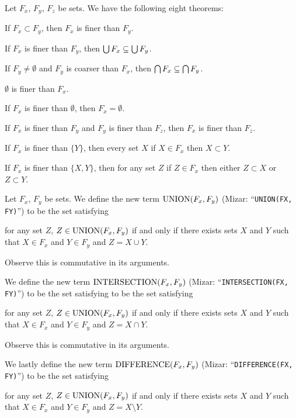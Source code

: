\documentclass{article}
\begin{document}
Let $F_{x}$, $F_{y}$, $F_{z}$ be sets. We have the following eight theorems:
\begin{thm}
\item\label{setfam1:12} If $F_{x}\subset F_{y}$, then $F_{x}$ is finer
  than $F_{y}$.
\item\label{setfam1:13} If $F_{x}$ is finer than $F_{y}$, then $\bigcup F_{x}\subseteq \bigcup F_{y}$.
\item\label{setfam1:14} If $F_{y}\neq\emptyset$ and $F_{y}$ is coarser
  than $F_{x}$, then $\bigcap F_{x}\subseteq\bigcap F_{y}$.
\item\label{setfam1:15} $\emptyset$ is finer than $F_{x}$.
\item\label{setfam1:16} If $F_{x}$ is finer than $\emptyset$, then $F_{x}=\emptyset$.
\item\label{setfam1:17} If $F_{x}$ is finer than $F_{y}$ and $F_{y}$ is
  finer than $F_{z}$, then $F_{x}$ is finer than $F_{z}$.
\item\label{setfam1:18} If $F_{x}$ is finer than $\{Y\}$, then every set $X$
  if $X\in F_{x}$ then $X\subset Y$. 
\item\label{setfam1:19} If $F_{x}$ is finer than $\{X,Y\}$, then for any
  set $Z$ if $Z\in F_{x}$ then either $Z\subset X$ or $Z\subset Y$.
\end{thm}

\begin{definition}
  Let $F_{x}$, $F_{y}$ be sets.
We define the new term $\operatorname{UNION}(F_{x},F_{y})$ (Mizar:
  ``\verb#UNION(FX, FY)#'')
to be the set satisfying
\begin{defn}
\item for any set $Z$, $Z\in\operatorname{UNION}(F_{x},F_{y})$ if and only if there
  exists sets $X$ and $Y$ such that $X\in F_{x}$ and $Y\in F_{y}$
  and $Z=X\cup Y$.
\end{defn}
Observe this is commutative in its arguments.

We define the new term $\operatorname{INTERSECTION}(F_{x},F_{y})$ (Mizar:
  ``\verb#INTERSECTION(FX, FY)#'') to be the set satisfying
to be the set satisfying
\begin{defn}
\item for any set $Z$, $Z\in\operatorname{UNION}(F_{x},F_{y})$ if and only if there
  exists sets $X$ and $Y$ such that $X\in F_{x}$ and $Y\in F_{y}$
  and $Z=X\cap Y$.
\end{defn}
Observe this is commutative in its arguments.

We lastly define the new term $\operatorname{DIFFERENCE}(F_{x},F_{y})$ (Mizar:
  ``\verb#DIFFERENCE(FX, FY)#'') to be the set
  satisfying
\begin{defn}
\item for any set $Z$, $Z\in\operatorname{UNION}(F_{x},F_{y})$ if and only if there
  exists sets $X$ and $Y$ such that $X\in F_{x}$ and $Y\in F_{y}$
  and $Z=X\setminus Y$.
\end{defn}
\end{definition}
\end{document}
